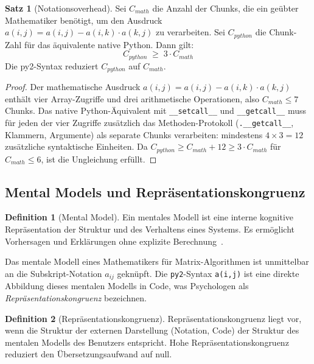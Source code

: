 ﻿\documentclass[a4paper,12pt]{article}
\theoremstyle{definition}
\newtheorem{definition}{Definition}
\newtheorem{satz}{Satz}
\begin{document}
\begin{satz}[Notationsoverhead]
	Sei $C_{math}$ die Anzahl der Chunks, die ein ge\"ubter Mathematiker ben\"otigt,
	um den Ausdruck $a(i,j) = a(i,j) - a(i,k) \cdot a(k,j)$ zu verarbeiten. Sei
	$C_{python}$ die Chunk-Zahl f\"ur das \"aquivalente native Python. Dann gilt:
	\[
		C_{python} \;\geq\; 3 \cdot C_{math}
	\]
	Die py2-Syntax reduziert $C_{python}$ auf $C_{math}$.
\end{satz}

\begin{proof}
	Der mathematische Ausdruck $a(i,j) = a(i,j) - a(i,k) \cdot a(k,j)$ enth\"alt
	vier Array-Zugriffe und drei arithmetische Operationen, also $C_{math} \leq 7$ Chunks.
	Das native Python-\"Aquivalent mit \texttt{\_\_setcall\_\_} und \texttt{\_\_getcall\_\_}
	muss f\"ur jeden der vier Zugriffe zus\"atzlich das Methoden-Protokoll (\texttt{.\_\_getcall\_\_},
	Klammern, Argumente) als separate Chunks verarbeiten: mindestens $4 \times 3 = 12$
	zus\"atzliche syntaktische Einheiten. Da $C_{python} \geq C_{math} + 12 \geq 3 \cdot C_{math}$
	f\"ur $C_{math} \leq 6$, ist die Ungleichung erf\"ullt.
\end{proof}

\subsection{Mental Models und Repr\"asentationskongruenz}

\begin{definition}[Mental Model]
	Ein mentales Modell ist eine interne kognitive Repr\"asentation der Struktur und
	des Verhaltens eines Systems. Es erm\"oglicht Vorhersagen und Erkl\"arungen ohne
	explizite Berechnung~\cite{johnson-laird1983}.
\end{definition}

Das mentale Modell eines Mathematikers f\"ur Matrix-Algorithmen ist unmittelbar an die
Subskript-Notation $a_{ij}$ gekn\"upft. Die \texttt{py2}-Syntax \texttt{a(i,j)} ist
eine direkte Abbildung dieses mentalen Modells in Code, was Psychologen als
\emph{Repr\"asentationskongruenz} bezeichnen.

\begin{definition}[Repr\"asentationskongruenz]
	Repr\"asentationskongruenz liegt vor, wenn die Struktur der externen Darstellung
	(Notation, Code) der Struktur des mentalen Modells des Benutzers entspricht.
	Hohe Repr\"asentationskongruenz reduziert den \"Ubersetzungsaufwand auf null.
\end{definition}
\end{document}
